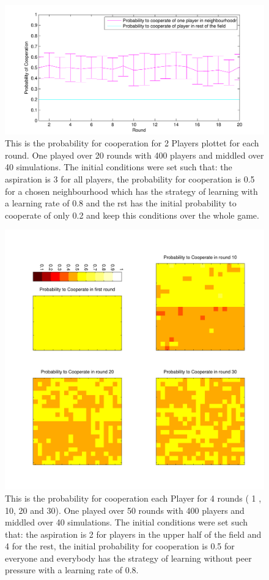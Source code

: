 \documentclass[11pt]{article}
\begin{document}
\begin{figure}
\centering
\includegraphics[scale=0.8]{ProbCoopwithtime35a.pdf}
\caption[]{This is the probability for cooperation for 2 Players plottet for each round. One played over 20 rounds with 400 players and middled over 40 simulations. The initial conditions were set such that: the aspiration is 3 for all players, the probability for cooperation is 0.5 for a chosen neighbourhood which has the strategy of learning with a learning rate of 0.8 and the rst has the initial probability to cooperate of only 0.2 and keep this conditions over the whole game.}
\label{exp35atime}
\end{figure}

\begin{figure}
\centering
\includegraphics[scale=0.6]{ProbabilityToCooperateInDiffRound11.pdf}
\caption[]{This is the probability for cooperation each Player for 4 rounds ( 1 , 10, 20 and 30). One played over 50 rounds with 400 players and middled over 40 simulations. The initial conditions were set such that: the aspiration is 2 for players in the upper half of the field and 4 for the rest, the initial probability for cooperation is 0.5 for everyone and everybody has the strategy of learning without peer pressure with a learning rate of 0.8. }
\label{exp11}
\end{figure}
\end{document}
